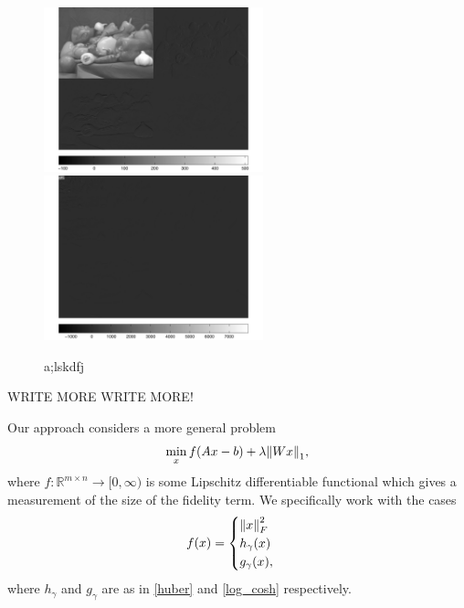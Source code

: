 \documentclass[10pt,a4paper]{article}
\newcommand{\R}{\mathbb{R}}
\begin{document}
\begin{figure}[H]
\centering
\includegraphics[width=2.5in]{../figures/haarTrans2} \quad
\includegraphics[width=2.5in]{../figures/haarTrans3}
\caption{a;lskdfj}
\end{figure}


WRITE MORE WRITE MORE!

Our approach considers a more general problem
\begin{equation} \label{wavelet}
\min_{x} f(Ax - b ) + \lambda \norm{Wx}_1,
\end{equation}
where $f: \R^{m \times n} \rightarrow [0,\infty)$ is some Lipschitz differentiable functional which gives a measurement of the size of the fidelity term. We specifically work with the cases 
\begin{equation} \label{fidelities}
f(x) = \begin{cases}
\norm{x}_F^2 \\
h_\gamma(x) \\
g_\gamma(x),
\end{cases}
\end{equation}
where $h_\gamma$ and $g_\gamma$ are as in \eqref{huber} and \eqref{log_cosh} respectively. 

\end{document}
